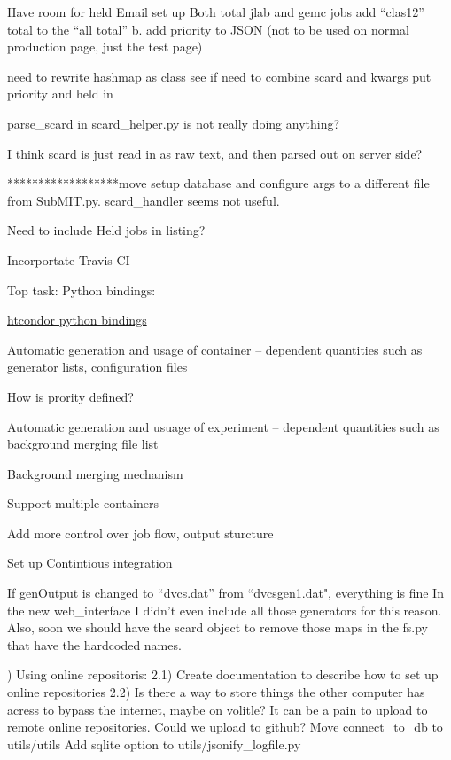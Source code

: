 Have room for held
Email set up
Both total jlab and gemc jobs
add “clas12” total to the “all total”
b. add priority to JSON (not to be used on normal production page, just the test page)


need to rewrite hashmap as class
see if need to combine scard and kwargs
put priority and held in 

parse_scard in scard_helper.py is not really doing anything?


I think scard is just read in as raw text, and then parsed out on server side?


******************move setup database and configure args to a different file from SubMIT.py. scard_handler seems not useful. 





Need to include Held jobs in listing?

Incorportate Travis-CI

Top task: Python bindings: 

\href{https://htcondor.readthedocs.io/en/latest/apis/python-bindings/}{htcondor python bindings}


Automatic generation and usage of container – dependent quantities such as generator lists, configuration files

How is prority defined?

Automatic generation and usuage of experiment – dependent quantities such as background merging file list 


Background merging mechanism


Support multiple containers


Add more control over job flow, output sturcture

Set up Contintious integration



If genOutput is changed to “dvcs.dat” from “dvcsgen1.dat", everything is fine
In the new web_interface I didn’t even include all those generators for this reason. Also, soon we should have the scard object to remove those maps in the fs.py that have the hardcoded names.



) Using online repositoris:
	2.1) Create documentation to describe how to set up online repositories
	2.2) Is there a way to store things the other computer has acress to bypass the internet, maybe on volitle? It can be a pain to upload to remote online repositories. Could we upload to 	github?
Move connect_to_db to utils/utils
Add sqlite option to utils/jsonify_logfile.py



